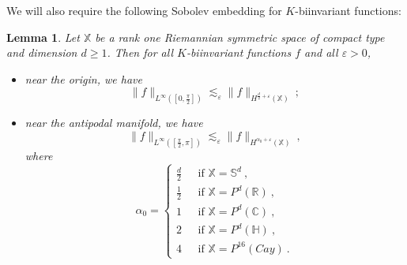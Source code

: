 \documentclass[12pt]{amsart}
\newtheorem{lemma}[theorem]{Lemma}
\theoremstyle{definition}
\newcommand{\R}{\mathbb R}%
\newcommand{\C}{\mathbb C}%
\newcommand{\Sb}{\mathbb S}%
\newcommand{\X}{\mathbb X}%
\newcommand{\Hb}{\mathbb H}%
\numberwithin{equation}{section}
\begin{document}
We will also require the following Sobolev embedding for $K$-biinvariant functions:
\begin{lemma} \label{sobolev_embedding}
Let $\X$ be a rank one Riemannian symmetric space of compact type and dimension $d \ge 1$. Then for all $K$-biinvariant functions $f$ and all $\varepsilon>0$, 
\begin{itemize}
\item[(i)] near the origin, we have
\begin{equation*}
\|f\|_{L^\infty\left(\left[0,\frac{\pi}{2}\right]\right)} \lesssim_\varepsilon \|f\|_{H^{\frac{d}{2}+\varepsilon}(\X)}\:;
\end{equation*}
\item[(ii)] near the antipodal manifold, we have
\begin{equation*}
\|f\|_{L^\infty\left(\left[\frac{\pi}{2},\pi\right]\right)} \lesssim_\varepsilon \|f\|_{H^{\alpha_0+\varepsilon}(\X)}\:,
\end{equation*}
where 
\begin{equation*}
\alpha_0 =
\begin{cases}
\frac{d}{2}\:\:\:&\text{if } \X=\Sb^d\:,\\
\frac{1}{2}\:\:\:&\text{if } \X=P^d(\R)\:,\\
1\:\:\:&\text{if } \X=P^d(\C)\:,\\
2\:\:\:&\text{if } \X=P^d(\Hb)\:,\\
4\:\:\:&\text{if } \X=P^{16}(Cay)\:.
\end{cases}
\end{equation*}
\end{itemize}
\end{lemma}
\end{document}
